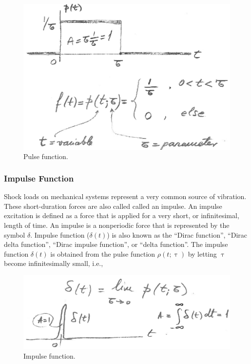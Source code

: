 \documentclass[12pt,letter]{article}
\numberwithin{ex}{section} %
\numberwithin{re}{section} %
\numberwithin{equation}{section}	%
\begin{document}
\begin{figure}[H]
	\centering
	\includegraphics[width=5.5in]{../figures/pulse_function.png}
	\caption{Pulse function.}
\end{figure}

\subsubsection{Impulse Function}

Shock loads on mechanical systems represent a very common source of vibration. These short-duration forces are also called called an impulse. An impulse excitation is defined as a force that is applied for a very short, or infinitesimal, length of time. An impulse is a nonperiodic force that is represented by the symbol $\delta$. Impulse function ($\delta(t)$) is also known as the ``Dirac function'', ``Dirac delta function'', ``Dirac impulse function'', or ``delta function''. The impulse function $\delta(t)$ is obtained from the pulse function $\rho(t;\uptau)$ by letting $\uptau$ become infinitesimally small, i.e., 

\begin{figure}[H]
	\centering
	\includegraphics[width=5.5in]{../figures/impulse_function.png}
	\caption{Impulse function.}
\end{figure}
\end{document}

